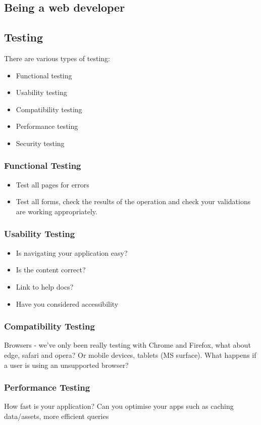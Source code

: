 \documentclass[a4paper]{article}
\theoremstyle{plain}
\theoremstyle{definition}
\theoremstyle{remark}
\begin{document}
\begin{flushleft}
\section{Being a web developer}
\subsection{Testing}
There are various types of testing:
\begin{itemize}
	\item Functional testing
	\item Usability testing
	\item Compatibility testing
	\item Performance testing
	\item Security testing
\end{itemize}
\subsubsection{Functional Testing}
\begin{itemize}
	\item Test all pages for errors
	\item Test all forms, check the results of the operation and check your validations are working appropriately. 
\end{itemize}
\subsubsection{Usability Testing}
\begin{itemize}
	\item Is navigating your application easy?
	\item Is the content correct?
	\item Link to help docs?
	\item Have you considered accessibility
\end{itemize}
\subsubsection{Compatibility Testing}
Browsers - we've only been really testing with Chrome and Firefox, what about edge, safari and opera? Or mobile devices, tablets (MS surface). What happens if a user is using an unsupported browser?
\subsubsection{Performance Testing}
How fast is your application? Can you optimise your apps such as caching data/assets, more efficient queries

\end{flushleft}
\end{document}
